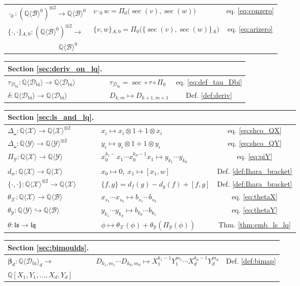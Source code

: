\documentclass[12pt,reqno]{amsart}
\numberwithin{equation}{section}
\theoremstyle{definition}
\newcommand{\QQ}{\mathbb{Q}}
\newcommand{\bimap}{\boldsymbol{\beta}}
\newcommand{\B}{\mathcal{B}}
\newcommand{\QB}{\QQ\langle \B\rangle}
\newcommand{\X}{\mathcal{X}}
\newcommand{\QX}{\QQ\langle \X\rangle}
\newcommand{\Y}{\mathcal{Y}}
\newcommand{\QY}{\QQ\langle \Y\rangle}
\newcommand{\Dbi}{\mathcal{D}_{\operatorname{bi}}}
\newcommand{\QDbi}{\QQ\langle \Dbi\rangle}
\newcommand{\ls}{\mathfrak{ls}}
\newcommand{\lqq}{\mathfrak{lq}}
\newcommand{\ari}[2]{\{#1,#2\}\!_A}
\newcommand{\arizero}[2]{\{#1,#2\}\!_{A,0}}
\newcommand{\conczero}{\cdot_0}
\newcommand{\shco}{\Delta_{\shuffle}}
\newcommand{\pizero}{\Pi_0}
\newcommand{\piY}{\Pi_\Y}
\newcommand{\thetaX}{\theta_\X}
\newcommand{\thetaY}{\theta_\Y}
\begin{document}
\begin{table}[H]
\begin{tabular}{p{4.4cm}p{9.5cm}c}
$\conczero:(\QB^0)^{\otimes2}\to\QB^0$ & $v \conczero w=\pizero\big(\sec(v),\sec(w)\big) $ & eq. \eqref{eq:conzero} \\
$\arizero{\cdot}{\cdot}:(\QB^0)^{\otimes2}\to$ & $\arizero{v}{w}=\pizero\big(\ari{\sec(v)}{\sec(w)}\big)$ & eq. \eqref{eq:arizero} \\
$\hspace{3cm}\QB^0$ & &
\end{tabular} 
\end{table}
\begin{table}[H]
\begin{tabular}{p{4.4cm}p{9.5cm}c}
\textbf{Section \ref{sec:deriv_on_lq}.} & & \\ \hline
$\tau_{\Dbi}:\QDbi\to\QDbi$ & $\tau_{\Dbi}=\sec\circ\tau\circ\pizero$ & eq. \eqref{eq:def_tau_Dbi} \\
$\delta:\QDbi\to\QDbi$ & $D_{k,m}\mapsto D_{k+1,m+1}$ & Def. \ref{def:deriv}
\end{tabular} 
\end{table}
\begin{table}[H]
\begin{tabular}{p{4.4cm}p{9.5cm}c}
\textbf{Section \ref{sec:ls_and_lq}.} & & \\ \hline
$\shco:\QX\to \QX^{\otimes2}$ & $x_i\mapsto x_i\otimes 1 +1 \otimes x_i$ & eq. \eqref{eq:shco_QX} \\
$\shco:\QY\to \QY^{\otimes2}$ & $y_i\mapsto y_i\otimes 1 +1 \otimes y_i$ & eq. \eqref{eq:shco_QY} \\
$\piY:\QX\to\QY$ & $x_0^{k_1-}x_1\cdots x_0^{k_d-1}x_1\mapsto y_{k_1}\cdots y_{k_d}$ & eq. \eqref{eq:piY} \\
$d_w:\QX\to\QX$ & $x_0\mapsto 0,\ x_1\mapsto [x_1,w]$ & Def. \ref{def:Ihara_bracket} \\
$\{\cdot,\cdot\}:\QX^{\otimes2}\to\QX$ & $\{f,g\}=d_f(g)-d_g(f)+[f,g]$ & Def. \ref{def:Ihara_bracket}\\
$\thetaX: \QX\to \QB$ & $x_{s_1}\cdots x_{s_k} \mapsto b_{s_1}\cdots b_{s_k}$ & eq. \eqref{eq:thetaX} \\
$\thetaY:\QY\hookrightarrow \QB$ & $y_{k_1}\cdots y_{k_d} \mapsto b_{k_d}\cdots b_{k_1}$ & eq. \eqref{eq:thetaY} \\
$\theta:\ls\to\lqq$ & $\phi\mapsto \thetaX(\phi)+\thetaY(\piY(\phi))$ & Thm. \ref{thm:emb_ls_lq} 
\end{tabular} 
\end{table}
\begin{table}[H]
\begin{tabular}{p{4.4cm}p{9.5cm}c}
\textbf{Section \ref{sec:bimoulds}.} & & \\ \hline
$\bimap_d:\QDbi_d\to$ & $D_{k_1,m_1}\cdots D_{k_d,m_d}\mapsto X_1^{k_1-1}Y_1^{m_1}\cdots X_d^{k_d-1}Y_d^{m_d}$ & Def. \ref{def:bimap} \\
$\QQ[X_1,Y_1,\ldots,X_d,Y_d]$ & &
\end{tabular} 
\end{table}
\end{document}
